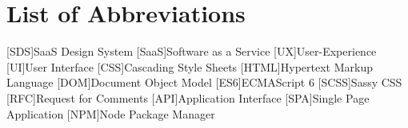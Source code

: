 \section*{List of Abbreviations}
\begin{acronym}
    [SDS]{SaaS Design System}
    [SaaS]{Software as a Service}
    [UX]{User-Experience}
    [UI]{User Interface}
    [CSS]{Cascading Style Sheets}
    [HTML]{Hypertext Markup Language}
    [DOM]{Document Object Model}
    [ES6]{ECMAScript 6}
    [SCSS]{Sassy CSS}
    [RFC]{Request for Comments}
    [API]{Application Interface}
    [SPA]{Single Page Application}
    [NPM]{Node Package Manager}
\end{acronym}